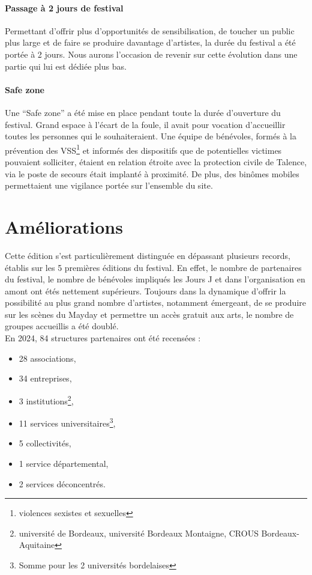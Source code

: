 \documentclass[12pt,a4paper]{report}
\begin{document}
\paragraph{Passage à 2 jours de festival}
Permettant d'offrir plus d'opportunités de sensibilisation, de toucher un public plus large et de faire se produire davantage d'artistes, la durée du festival a été portée à 2 jours. Nous aurons l’occasion de revenir sur cette évolution dans une partie qui lui est dédiée plus bas.

\paragraph{Safe zone}
Une “Safe zone” a été mise en place pendant toute la durée d’ouverture du festival. Grand espace à l'écart de la foule, il avait pour vocation d'accueillir toutes les personnes qui le souhaiteraient. Une équipe de bénévoles, formés à la prévention des VSS\footnote{violences sexistes et sexuelles} et informés des dispositifs que de potentielles victimes pouvaient solliciter, étaient en relation étroite avec la protection civile de Talence, via le poste de secours était implanté à proximité. De plus, des binômes mobiles permettaient une vigilance portée sur l’ensemble du site.

\section{Améliorations}
Cette édition s'est particulièrement distinguée en dépassant plusieurs records, établis sur les 5 premières éditions du festival. En effet, le nombre de partenaires du festival, le nombre de bénévoles impliqués les Jours J et dans l'organisation en amont ont étés nettement supérieurs. Toujours dans la dynamique d'offrir la possibilité au plus grand nombre d'artistes, notamment émergeant, de se produire sur les scènes du Mayday et permettre un accès gratuit aux arts, le nombre de groupes accueillis a été doublé.\\

En 2024, 84 structures partenaires ont été recensées :
\begin{itemize}
\item 28 associations,
\item 34 entreprises,
\item 3 institutions\footnote{université de Bordeaux, université Bordeaux Montaigne, CROUS Bordeaux-Aquitaine},
\item 11 services universitaires\footnote{Somme pour les 2 universités bordelaises},
\item 5 collectivités,
\item 1 service départemental,
\item 2 services déconcentrés.\\
\end{itemize}
\end{document}
